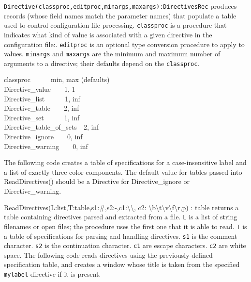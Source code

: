 \texttt{Directive(classproc,editproc,minargs,maxargs):DirectivesRec}
produces records (whose field names match the parameter names) that
populate a table used to control configuration file processing.
\texttt{classproc} is a procedure that indicates what kind of value is
associated with a given directive in the configuration file:.
\texttt{editproc} is an optional type conversion procedure to apply to
values. \texttt{minargs} and \texttt{maxargs} are the minimum and
maximum number of arguments to a directive; their defaults depend on
the \texttt{classproc}.

classproc\ \ \ \ \ \ min, max (defaults)\\
Directive\_value\ \ \ \ 1, 1\\
Directive\_list\ \ \ \ \ \ 1, inf\ \ \ \ \\
Directive\_table\ \ \ \ 2, inf\\
Directive\_set\ \ \ \ \ \ 1, inf\\
Directive\_table\_of\_sets\ \ 2, inf\\
Directive\_ignore\ \ \ \ 0, inf\\
Directive\_warning\ \ \ \ 0, inf

The following code creates a table of specifications for a
case-insensitive label and a list of exactly three color components.
The default value for tables passed into \textsf{ReadDirectives()}
should be a \textsf{Directive} for \textsf{Directive\_ignore} or
\textsf{Directive\_warning}.


\textsf{ReadDirectives(L:list,T:table,s1:{\textquotedbl}\#{\textquotedbl},s2:{\textquotedbl}-{\textquotedbl},c1:{\textquotesingle}{\textbackslash}{\textbackslash}{\textquotesingle},
c2:{\textquotesingle}
{\textbackslash}b{\textbackslash}t{\textbackslash}v{\textbackslash}f{\textbackslash}r{\textquotesingle},p)
: table} returns a table containing directives parsed and extracted
from a file. \texttt{L} is a list of string filenames or open files;
the procedure uses the first one that it is able to read. \texttt{T} is
a table of specifications for parsing and handling directives.
\texttt{s1} is the comment character. \texttt{s2} is the continuation
character. \texttt{c1} are escape characters. \texttt{c2} are white
space. The following code reads directives using the previously-defined
specification table, and creates a window whose title is taken from the
specified \texttt{mylabel} directive if it is present.

